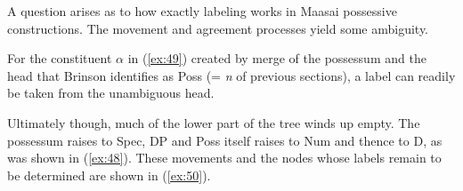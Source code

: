 \documentclass[output=paper
,modfonts
,nonflat]{langsci/langscibook}
\begin{document}
A question arises as to how exactly labeling works in Maasai possessive constructions. The movement and agreement processes yield some ambiguity.

For the constituent $\alpha$ in (\ref{ex:49}) created by merge of the possessum and the head that Brinson identifies as Poss (= \textit{n} of previous sections), a label can readily be taken from the unambiguous head.  

\begin{figure}[!h]
	\begin{exe}
	\end{exe}
\end{figure}
\noindent Ultimately though, much of the lower part of the tree winds up empty. The possessum raises to Spec, DP and Poss itself raises to Num and thence to D, as was shown in (\ref{ex:48}). These movements and the nodes whose labels remain to be determined are shown in (\ref{ex:50}).
\end{document}
